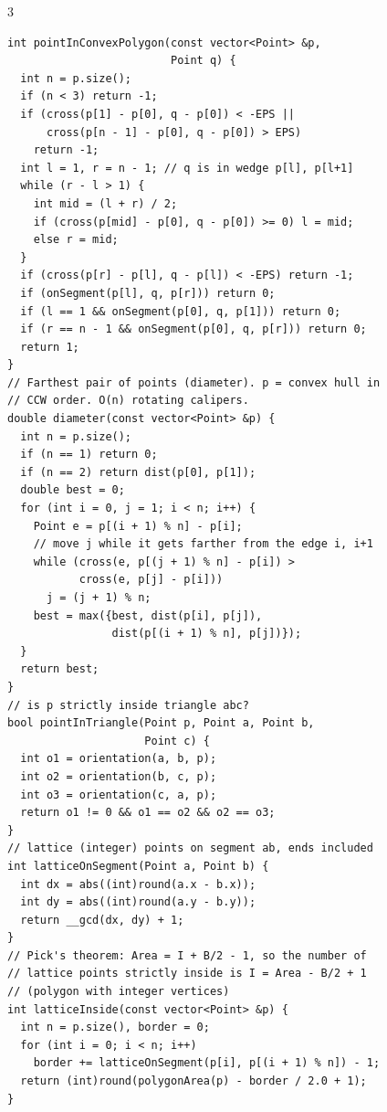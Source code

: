 \documentclass[8pt, a4paper]{article}
\begin{document}
\begin{multicols*}{3}
\begin{lstlisting}
int pointInConvexPolygon(const vector<Point> &p,
                         Point q) {
  int n = p.size();
  if (n < 3) return -1;
  if (cross(p[1] - p[0], q - p[0]) < -EPS ||
      cross(p[n - 1] - p[0], q - p[0]) > EPS)
    return -1;
  int l = 1, r = n - 1; // q is in wedge p[l], p[l+1]
  while (r - l > 1) {
    int mid = (l + r) / 2;
    if (cross(p[mid] - p[0], q - p[0]) >= 0) l = mid;
    else r = mid;
  }
  if (cross(p[r] - p[l], q - p[l]) < -EPS) return -1;
  if (onSegment(p[l], q, p[r])) return 0;
  if (l == 1 && onSegment(p[0], q, p[1])) return 0;
  if (r == n - 1 && onSegment(p[0], q, p[r])) return 0;
  return 1;
}
// Farthest pair of points (diameter). p = convex hull in
// CCW order. O(n) rotating calipers.
double diameter(const vector<Point> &p) {
  int n = p.size();
  if (n == 1) return 0;
  if (n == 2) return dist(p[0], p[1]);
  double best = 0;
  for (int i = 0, j = 1; i < n; i++) {
    Point e = p[(i + 1) % n] - p[i];
    // move j while it gets farther from the edge i, i+1
    while (cross(e, p[(j + 1) % n] - p[i]) >
           cross(e, p[j] - p[i]))
      j = (j + 1) % n;
    best = max({best, dist(p[i], p[j]),
                dist(p[(i + 1) % n], p[j])});
  }
  return best;
}
// is p strictly inside triangle abc?
bool pointInTriangle(Point p, Point a, Point b,
                     Point c) {
  int o1 = orientation(a, b, p);
  int o2 = orientation(b, c, p);
  int o3 = orientation(c, a, p);
  return o1 != 0 && o1 == o2 && o2 == o3;
}
// lattice (integer) points on segment ab, ends included
int latticeOnSegment(Point a, Point b) {
  int dx = abs((int)round(a.x - b.x));
  int dy = abs((int)round(a.y - b.y));
  return __gcd(dx, dy) + 1;
}
// Pick's theorem: Area = I + B/2 - 1, so the number of
// lattice points strictly inside is I = Area - B/2 + 1
// (polygon with integer vertices)
int latticeInside(const vector<Point> &p) {
  int n = p.size(), border = 0;
  for (int i = 0; i < n; i++)
    border += latticeOnSegment(p[i], p[(i + 1) % n]) - 1;
  return (int)round(polygonArea(p) - border / 2.0 + 1);
}
\end{lstlisting}

\end{multicols*}
\end{document}
